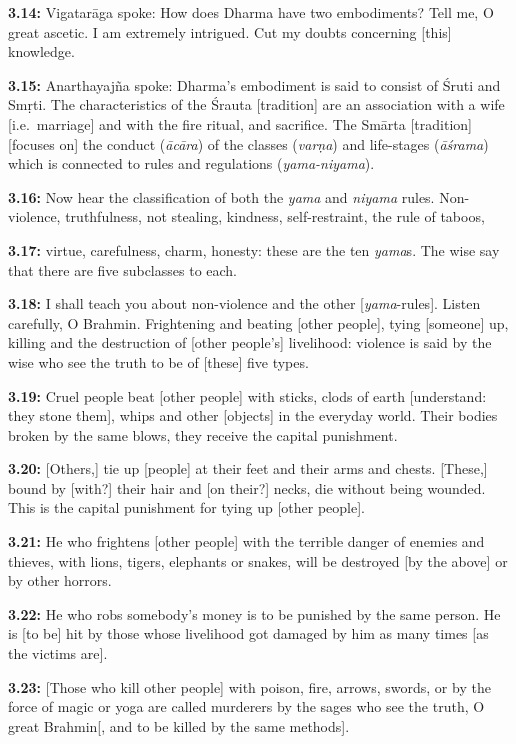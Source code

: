 \documentclass{article}
\newcommand{\vsnum}[1]{\textbf{#1}}
\newcommand{\skt}[1]{\textit{#1}}
\begin{document}
\vsnum{3.14: }Vigatarāga spoke: How does Dharma have two embodiments? Tell me, O great ascetic. I am extremely intrigued. Cut my doubts concerning [this] knowledge.

\vsnum{3.15: }Anarthayajña spoke: Dharma's embodiment is said to consist of Śruti and Smṛti. The characteristics of the Śrauta [tradition] are an association with a wife [i.e.\ marriage] and with the fire ritual, and sacrifice. The Smārta [tradition] [focuses on] the conduct (\skt{ācāra}) of the classes (\skt{varṇa}) and life-stages (\skt{āśrama}) which is connected to rules and regulations (\skt{yama-niyama}).

\vsnum{3.16: }Now hear the classification of both the \skt{yama} and \skt{niyama} rules. Non-violence, truthfulness, not stealing, kindness, self-restraint, the rule of taboos,

\vsnum{3.17: }virtue, carefulness, charm, honesty: these are the ten \skt{yama}s. The wise say that there are five subclasses to each.

\vsnum{3.18: }I shall teach you about non-violence and the other [\skt{yama}-rules]. Listen carefully, O Brahmin. Frightening and beating [other people], tying [someone] up, killing and the destruction of [other people's] livelihood: violence is said by the wise who see the truth to be of [these] five types.

\vsnum{3.19: }Cruel people beat [other people] with sticks, clods of earth [understand: they stone them], whips and other [objects] in the everyday world. Their bodies broken by the same blows, they receive the capital punishment.

\vsnum{3.20: }[Others,] tie up [people] at their feet and their arms and chests. [These,] bound by [with?] their hair and [on their?] necks, die without being wounded. This is the capital punishment for tying up [other people].

\vsnum{3.21: }He who frightens [other people] with the terrible danger of enemies and thieves, with lions, tigers, elephants or snakes, will be destroyed [by the above] or by other horrors.

\vsnum{3.22: }He who robs somebody's money is to be punished by the same person. He is [to be] hit by those whose livelihood got damaged by him as many times [as the victims are].

\vsnum{3.23: }[Those who kill other people] with poison, fire, arrows, swords, or by the force of magic or yoga are called murderers by the sages who see the truth, O great Brahmin[, and to be killed by the same methods].
\end{document}
